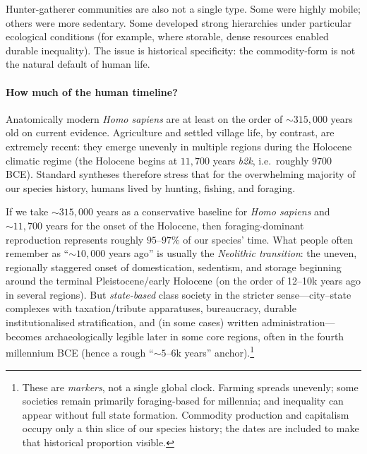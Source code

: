 Hunter-gatherer communities are also not a single type. Some were highly mobile; others were more sedentary.
Some developed strong hierarchies under particular ecological conditions (for example, where storable, dense
resources enabled durable inequality). The issue is historical specificity: the
commodity-form is not the natural default of human life.

\paragraph{How much of the human timeline?}
Anatomically modern \emph{Homo sapiens} are at least on the order of \(\sim 315{,}000\) years old on current
evidence.\cite{Hublin2017,Richter2017} Agriculture and settled village life, by contrast, are extremely recent:
they emerge unevenly in multiple regions during the Holocene climatic regime (the Holocene begins at \(11{,}700\)
years \emph{b2k}, i.e.\ roughly \(9700\) BCE).\cite{Walker2018Holocene,Zeder2011,Fuller2023}
Standard syntheses therefore stress that for the overwhelming majority of our species history, humans lived by
hunting, fishing, and foraging.\cite{LeeDaly1999}

If we take \(\sim 315{,}000\) years as a conservative baseline for \emph{Homo sapiens} and \(\sim 11{,}700\) years for the onset of the Holocene, then foraging-dominant reproduction represents roughly \(95\)–\(97\%\) of our species’ time. What people often remember as ``\(\sim 10{,}000\) years ago'' is usually the \emph{Neolithic transition}: the uneven, regionally staggered onset of domestication, sedentism, and storage beginning around the terminal Pleistocene/early Holocene (on the order of 12--10k years ago in several regions). But \emph{state-based} class society in the stricter sense---city--state complexes with taxation/tribute apparatuses, bureaucracy, durable institutionalised stratification, and (in some cases) written administration---becomes archaeologically legible later in some core regions, often in the fourth millennium BCE (hence a rough ``\(\sim 5\)–\(6\)k years'' anchor).\cite{Scott2017}\footnote{These are \emph{markers}, not a single global clock. Farming spreads unevenly; some societies remain primarily foraging-based for millennia; and inequality can appear without full state formation. Commodity production and capitalism occupy only a thin slice of our species history; the dates are included to make that historical proportion visible.}


